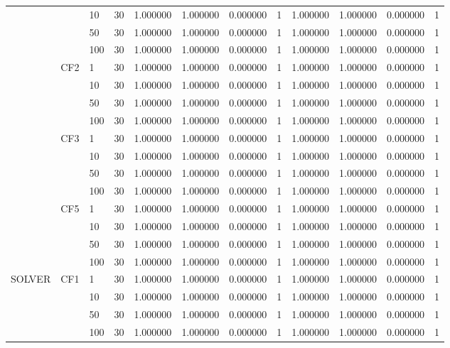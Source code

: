 \begin{tabular}{lllrrrrrrrrr}
 &  & 10 & 30 & 1.000000 & 1.000000 & 0.000000 & 1 & 1.000000 & 1.000000 & 0.000000 & 1 \\
 &  & 50 & 30 & 1.000000 & 1.000000 & 0.000000 & 1 & 1.000000 & 1.000000 & 0.000000 & 1 \\
 &  & 100 & 30 & 1.000000 & 1.000000 & 0.000000 & 1 & 1.000000 & 1.000000 & 0.000000 & 1 \\
\cline{2-12}
 & \multirow[t]{4}{*}{CF2} & 1 & 30 & 1.000000 & 1.000000 & 0.000000 & 1 & 1.000000 & 1.000000 & 0.000000 & 1 \\
 &  & 10 & 30 & 1.000000 & 1.000000 & 0.000000 & 1 & 1.000000 & 1.000000 & 0.000000 & 1 \\
 &  & 50 & 30 & 1.000000 & 1.000000 & 0.000000 & 1 & 1.000000 & 1.000000 & 0.000000 & 1 \\
 &  & 100 & 30 & 1.000000 & 1.000000 & 0.000000 & 1 & 1.000000 & 1.000000 & 0.000000 & 1 \\
\cline{2-12}
 & \multirow[t]{4}{*}{CF3} & 1 & 30 & 1.000000 & 1.000000 & 0.000000 & 1 & 1.000000 & 1.000000 & 0.000000 & 1 \\
 &  & 10 & 30 & 1.000000 & 1.000000 & 0.000000 & 1 & 1.000000 & 1.000000 & 0.000000 & 1 \\
 &  & 50 & 30 & 1.000000 & 1.000000 & 0.000000 & 1 & 1.000000 & 1.000000 & 0.000000 & 1 \\
 &  & 100 & 30 & 1.000000 & 1.000000 & 0.000000 & 1 & 1.000000 & 1.000000 & 0.000000 & 1 \\
\cline{2-12}
 & \multirow[t]{4}{*}{CF5} & 1 & 30 & 1.000000 & 1.000000 & 0.000000 & 1 & 1.000000 & 1.000000 & 0.000000 & 1 \\
 &  & 10 & 30 & 1.000000 & 1.000000 & 0.000000 & 1 & 1.000000 & 1.000000 & 0.000000 & 1 \\
 &  & 50 & 30 & 1.000000 & 1.000000 & 0.000000 & 1 & 1.000000 & 1.000000 & 0.000000 & 1 \\
 &  & 100 & 30 & 1.000000 & 1.000000 & 0.000000 & 1 & 1.000000 & 1.000000 & 0.000000 & 1 \\
\cline{1-12} \cline{2-12}
\multirow[t]{16}{*}{SOLVER} & \multirow[t]{4}{*}{CF1} & 1 & 30 & 1.000000 & 1.000000 & 0.000000 & 1 & 1.000000 & 1.000000 & 0.000000 & 1 \\
 &  & 10 & 30 & 1.000000 & 1.000000 & 0.000000 & 1 & 1.000000 & 1.000000 & 0.000000 & 1 \\
 &  & 50 & 30 & 1.000000 & 1.000000 & 0.000000 & 1 & 1.000000 & 1.000000 & 0.000000 & 1 \\
 &  & 100 & 30 & 1.000000 & 1.000000 & 0.000000 & 1 & 1.000000 & 1.000000 & 0.000000 & 1 \\

\end{tabular}
